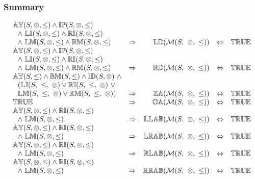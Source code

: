 \documentclass[../Summary.tex]{subfiles}
\begin{document}
\subsubsection{Summary}

\[
\begin{array}{lcrcl} 
\propname{AY}(S,\otimes,\leq) \wedge \propname{IP}(S,\otimes,\leq)  \\
\ \ \wedge \ \propname{LI}(S,\otimes,\leq) \wedge \propname{RI}(S,\otimes,\leq)  \\
\ \ \wedge \ \propname{LM}(S,\otimes,\leq) \wedge \propname{RM}(S,\otimes,\leq)
	& \Rightarrow
	& \propname{LD}(\mathcal{M}(S,\ \otimes,\ \leq)) 
    & \Leftrightarrow 
    & \propname{TRUE}
    \\ 
\propname{AY}(S,\otimes,\leq) \wedge \propname{IP}(S,\otimes,\leq)  \\
\ \ \wedge \ \propname{LI}(S,\otimes,\leq) \wedge \propname{RI}(S,\otimes,\leq)  \\
\ \ \wedge \ \propname{LM}(S,\otimes,\leq) \wedge \propname{RM}(S,\otimes,\leq)
	& \Rightarrow
	& \propname{RD}(\mathcal{M}(S,\ \otimes,\ \leq)) 
    & \Leftrightarrow 
    & \propname{TRUE}
    \\ 
\propname{AY}(S,\leq) \wedge \propname{BM}(S,\leq) \wedge \propname{ID}(S,\otimes) \ \wedge \\
\ \ (\propname{LI}(S,\ \leq,\ \otimes) \vee \propname{RI}(S,\ \leq,\ \otimes) \ \vee \\
\ \ \propname{LM}(S,\ \leq,\ \otimes) \vee \propname{RM}(S,\ \leq,\ \otimes))
	& \Rightarrow
	& \propname{ZA}(\mathcal{M}(S,\ \otimes,\ \leq)) 
    & \Leftrightarrow 
    & \propname{TRUE}
    \\
\propname{TRUE}
	& \Rightarrow
	& \propname{OA}(\mathcal{M}(S,\ \otimes,\ \leq)) 
    & \Leftrightarrow 
    & \propname{TRUE}
    \\  
\propname{AY}(S,\otimes,\leq) \wedge \propname{RI}(S,\otimes,\leq) \\ 
\ \ \wedge \ \propname{LM}(S,\otimes,\leq)
	& \Rightarrow
	& \propname{LLAB}(\mathcal{M}(S,\ \otimes,\ \leq)) 
    & \Leftrightarrow 
    & \propname{TRUE}
    \\
\propname{AY}(S,\otimes,\leq) \wedge \propname{RI}(S,\otimes,\leq) \\ 
\ \ \wedge \ \propname{LM}(S,\otimes,\leq)
	& \Rightarrow
	& \propname{LRAB}(\mathcal{M}(S,\ \otimes,\ \leq)) 
    & \Leftrightarrow 
    & \propname{TRUE}
    \\
\propname{AY}(S,\otimes,\leq) \wedge \propname{RI}(S,\otimes,\leq) \\ 
\ \ \wedge \ \propname{LM}(S,\otimes,\leq)
	& \Rightarrow
	& \propname{RLAB}(\mathcal{M}(S,\ \otimes,\ \leq)) 
    & \Leftrightarrow 
    & \propname{TRUE}
    \\
\propname{AY}(S,\otimes,\leq) \wedge \propname{RI}(S,\otimes,\leq) \\ 
\ \ \wedge \ \propname{LM}(S,\otimes,\leq)
	& \Rightarrow
	& \propname{RRAB}(\mathcal{M}(S,\ \otimes,\ \leq)) 
    & \Leftrightarrow 
    & \propname{TRUE}
    \\
\end{array} 
\] 
\end{document}
